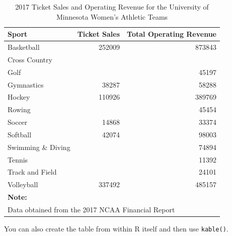 \documentclass[12pt,letterpaper,oneside,oldfontcommands]{memoir}
\newenvironment{Shaded}{\begin{snugshade}}{\end{snugshade}}
\newcommand{\DataTypeTok}[1]{\textcolor[rgb]{0.13,0.29,0.53}{#1}}
\newcommand{\DecValTok}[1]{\textcolor[rgb]{0.00,0.00,0.81}{#1}}
\newcommand{\KeywordTok}[1]{\textcolor[rgb]{0.13,0.29,0.53}{\textbf{#1}}}
\newcommand{\NormalTok}[1]{#1}
\newcommand{\OperatorTok}[1]{\textcolor[rgb]{0.81,0.36,0.00}{\textbf{#1}}}
\newcommand{\OtherTok}[1]{\textcolor[rgb]{0.56,0.35,0.01}{#1}}
\newcommand{\StringTok}[1]{\textcolor[rgb]{0.31,0.60,0.02}{#1}}
\theoremstyle{definition}
\theoremstyle{definition}
\theoremstyle{definition}
\theoremstyle{remark}
\begin{document}
\begin{table}

\caption{\label{tab:nice-tab-2}2017 Ticket Sales and Operating Revenue for the University of Minnesota Women's Athletic Teams}
\centering
\begin{tabular}[t]{lrr}
\toprule
Sport & Ticket Sales & Total Operating Revenue\\
\midrule
Basketball & 252009 & 873843\\
Cross Country &  & \\
Golf &  & 45197\\
Gymnastics & 38287 & 58288\\
Hockey & 110926 & 389769\\
\addlinespace
Rowing &  & 45454\\
Soccer & 14868 & 33374\\
Softball & 42074 & 98003\\
Swimming \& Diving &  & 74894\\
Tennis &  & 11392\\
\addlinespace
Track and Field &  & 24101\\
Volleyball & 337492 & 485157\\
\bottomrule
\multicolumn{3}{l}{\textbf{Note: } }\\
\multicolumn{3}{l}{Data obtained from the 2017 NCAA Financial Report}\\
\end{tabular}
\end{table}

You can also create the table from within R itself and then use
\texttt{kable()}.

\begin{Shaded}
\end{Shaded}
\end{document}
